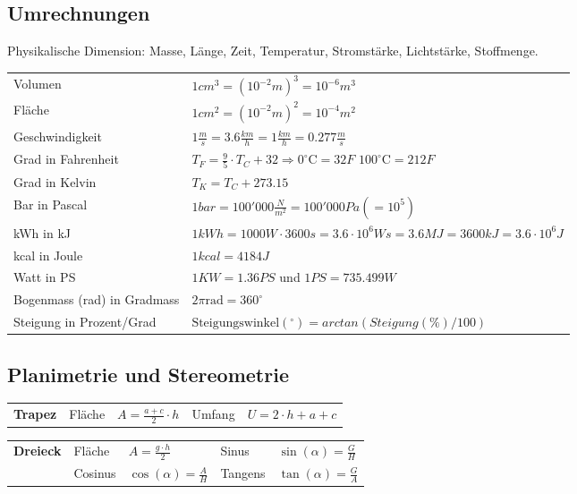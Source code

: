 \subsection{Umrechnungen}
Physikalische Dimension: Masse, Länge, Zeit, Temperatur, Stromstärke, Lichtstärke, Stoffmenge.
\begin{tabbing}
	\begin{tabu} to \linewidth {l X}
		\toprule
		Volumen & $1cm^3 = (10^{-2}m)^3 = 10^{-6}m^3$ \\ 
		Fläche &  $1cm^2 = (10^{-2}m)^2 = 10^{-4}m^2$ \\
		Geschwindigkeit & $1\frac{m}{s} = 3.6\frac{km}{h} = 1\frac{km}{h} = 0.277 \frac{m}{s}$ \\
		Grad in Fahrenheit & $T_F = \frac{9}{5} \cdot T_C + 32 \Rightarrow 0^\circ\text{C} = 32F$  $100^\circ\text{C} = 212F$ \\ 
		Grad in Kelvin & $T_K = T_C + 273.15$ \\
		Bar in Pascal & $1 bar = 100'000 \frac{N}{m^2} = 100'000 Pa (=10^5)$ \\
		kWh in kJ & $1kWh = 1000W \cdot 3600 s= 3.6 \cdot 10^6 Ws = 3.6 MJ = 3600kJ = 3.6 \cdot 10^6 J$ \\
		kcal in Joule & $1kcal = 4184 J$ \\
		Watt in PS & $1KW = 1.36PS$ und $1PS = 735.499W$ \\
		Bogenmass (rad) in Gradmass & $2\pi \mathrm{rad} = 360^\circ $\\
		Steigung in Prozent/Grad & $\text{Steigungswinkel}(^\circ) = arctan( Steigung(\%) / 100 )$ \\	
		\bottomrule
	\end{tabu}
\end{tabbing}

\subsection{Planimetrie und Stereometrie}

\begin{tabbing}
	\begin{tabu} to \linewidth {l l X l X}
		\toprule
		\textbf{Trapez} & Fläche & $A = \frac{a + c}{2} \cdot h$ & 
		Umfang & $U = 2 \cdot h  + a + c$ \\
	\end{tabu}
\end{tabbing}

\begin{tabbing}
	\begin{tabu} to \linewidth {l l X l X}
		\textbf{Dreieck} & Fläche & $A = \frac{g \cdot h}{2}$ & 
		Sinus & $\sin(\alpha) = \frac{G}{H}$ \\
		& Cosinus & $\cos(\alpha) = \frac{A}{H}$ &
		Tangens &  $\tan(\alpha) = \frac{G}{A}$ \\
	\end{tabu}
\end{tabbing}


